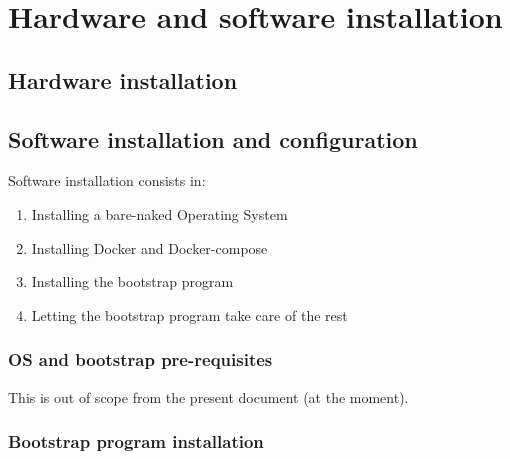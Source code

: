 \chapter{Hardware and software installation}
\label{chapter:installation}

\section{Hardware installation}


\section{Software installation and configuration}


Software installation consists in:

\begin{enumerate}
    \item Installing a bare-naked Operating System
    \item Installing Docker and Docker-compose
    \item Installing the bootstrap program
    \item Letting the bootstrap program take care of the rest
\end{enumerate}

\subsection{OS and bootstrap pre-requisites}

This is out of scope from the present document (at the moment).

\subsection{Bootstrap program installation}
